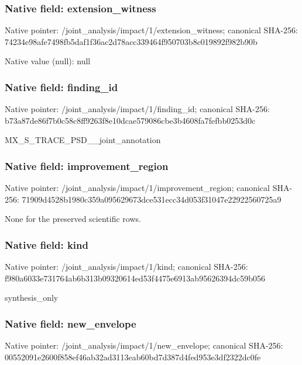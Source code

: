 \documentclass[10pt,a4paper]{article}
\begin{document}
\subsubsection{Native field: extension\_\allowbreak{}witness}
Native pointer: /joint\_\allowbreak{}analysis/impact/1/extension\_\allowbreak{}witness; canonical SHA-256: 74234e98afe7498fb5daf1f36ac2d78acc339464f950703b8c019892f982b90b

Native value (null): null

\subsubsection{Native field: finding\_\allowbreak{}id}
Native pointer: /joint\_\allowbreak{}analysis/impact/1/finding\_\allowbreak{}id; canonical SHA-256: b73a87de86f7b0c58c8ff9263f8e10dcae579086cbe3b4608fa7fefbb0253d0c

\begingroup\raggedright\sloppy MX\_\allowbreak{}S\_\allowbreak{}TRACE\_\allowbreak{}PSD\_\allowbreak{}\_\allowbreak{}joint\_\allowbreak{}annotation\par\endgroup

\subsubsection{Native field: improvement\_\allowbreak{}region}
Native pointer: /joint\_\allowbreak{}analysis/impact/1/improvement\_\allowbreak{}region; canonical SHA-256: 71909d4528b1980c359a095629673dce531ecc34d053f31047e22922560725a9

\begingroup\raggedright\sloppy None for the preserved scientific rows.\par\endgroup

\subsubsection{Native field: kind}
Native pointer: /joint\_\allowbreak{}analysis/impact/1/kind; canonical SHA-256: f980a6033e731764ab6b313b09320614ed53f4475e6913ab95626394dc59b056

\begingroup\raggedright\sloppy synthesis\_\allowbreak{}only\par\endgroup

\subsubsection{Native field: new\_\allowbreak{}envelope}
Native pointer: /joint\_\allowbreak{}analysis/impact/1/new\_\allowbreak{}envelope; canonical SHA-256: 00552091e2600f858ef46ab32ad3113eab60bd7d387d4fed953e3df2322dc0fe
\end{document}
